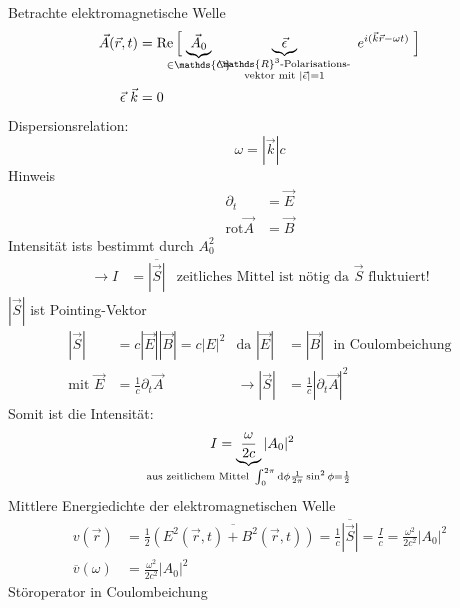 	Betrachte elektromagnetische Welle
		\begin{align*}
			\vec{A}(\vec{r} , t) &= 
			\mathrm{Re} \left[ \vphantom{ \vec{A}_0 \vec{\epsilon} ~ e^{i(\vec{k} \vec{r} - \omega t)}} \right.
			\underbrace{\vec{A}_0}_{\mathclap{\in \mathds{C}}}
			~ \underbrace{\vec{\epsilon}}_{\substack{\mathds{R}^3 \text{-Polarisations-} \\ \text{vektor mit~} |\vec{\epsilon}| = 1}}
			~ e^{i(\vec{k} \vec{r} - \omega t)}
			\left. \vphantom{ \vec{A}_0 \vec{\epsilon} ~ e^{i(\vec{k} \vec{r} - \omega t)}} \right] \\
			\vec{\epsilon} ~\vec{k} &= 0
		\end{align*}
	Dispersionsrelation: 
		\begin{equation*}
			\omega = |\vec{k}| c
		\end{equation*}
	Hinweis 
		\begin{align*}
			\partial_{t} &= \vec{E} \\
			\mathrm{rot} \vec{A} &= \vec{B}
		\end{align*}
	Intensität ists bestimmt durch $A_0^2$
		\begin{align*}
			\rightarrow I &= \overline{|\vec{S}|} & \text{zeitliches Mittel ist nötig da $\vec{S}$ fluktuiert!}
		\end{align*}
	$| \vec{S} |$ ist Pointing-Vektor 
		\begin{align*}
			| \vec{S} | &= c |\vec{E}| |\vec{B}| = c |E|^2 &\text{da~} |\vec{E}| &= |\vec{B}| \text{~ in Coulombeichung} \\
			\text{mit~} \vec{E} &= \frac{1}{c} \partial_t \vec{A} 
			&\rightarrow |\vec{S}| &= \frac{1}{c} \left|\partial_t \vec{A}\right|^2
		\end{align*}
	Somit ist die Intensität:
		\begin{align*}
			I &= \underbrace{\frac{\omega}{2 c}}_{\mathclap{\text{aus zeitlichem Mittel~} \int_{0}^{2 \pi} \diff \phi \frac{1}{2 \pi} \sin^2 \phi = \frac{1}{2}}}
			|A_0|^2
		\end{align*}
	Mittlere Energiedichte der elektromagnetischen Welle
		\begin{align*}
			v (\vec{r}) &=
			\frac{1}{2} \overline{\left( E^2(\vec{r} , t) + B^2(\vec{r} , t) \right)} 
			= \frac{1}{c} \overline{|\vec{S}|} = 
			\frac{I}{c} = \frac{\omega^2}{2 c^2} |A_0|^2 \\
			\overline{v} (\omega) &= \frac{\omega^2}{2 c^2} |A_0|^2
		\end{align*}
	Störoperator in Coulombeichung
